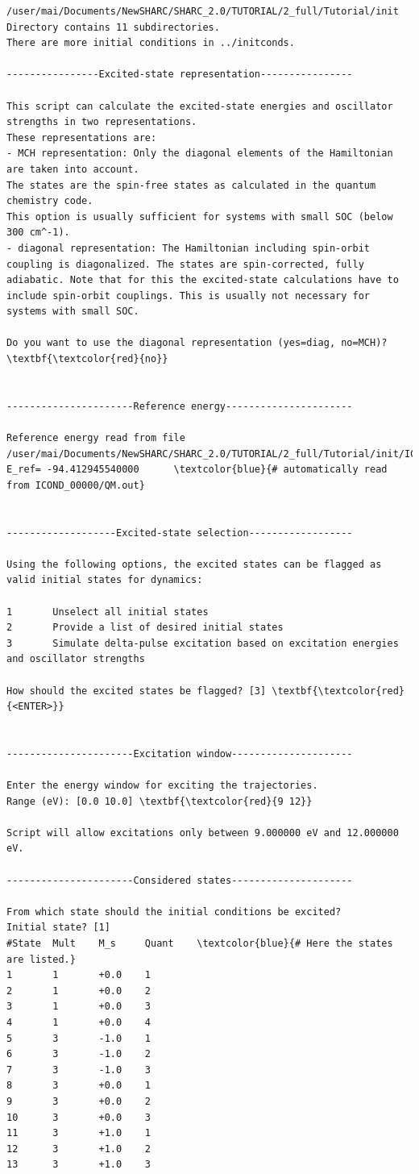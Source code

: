 \documentclass[a4paper,11pt,DIV=15,openany]{scrbook}
\begin{document}
\begin{oframed}
\begin{Verbatim}[commandchars=\\\{\}]
/user/mai/Documents/NewSHARC/SHARC_2.0/TUTORIAL/2_full/Tutorial/init
Directory contains 11 subdirectories.
There are more initial conditions in ../initconds.

----------------Excited-state representation----------------

This script can calculate the excited-state energies and oscillator strengths in two representations.
These representations are:
- MCH representation: Only the diagonal elements of the Hamiltonian are taken into account. 
The states are the spin-free states as calculated in the quantum chemistry code. 
This option is usually sufficient for systems with small SOC (below 300 cm^-1).
- diagonal representation: The Hamiltonian including spin-orbit coupling is diagonalized. The states are spin-corrected, fully adiabatic. Note that for this the excited-state calculations have to include spin-orbit couplings. This is usually not necessary for systems with small SOC.

Do you want to use the diagonal representation (yes=diag, no=MCH)? \textbf{\textcolor{red}{no}}


----------------------Reference energy----------------------

Reference energy read from file 
/user/mai/Documents/NewSHARC/SHARC_2.0/TUTORIAL/2_full/Tutorial/init/ICOND_00000/QM.out
E_ref= -94.412945540000      \textcolor{blue}{# automatically read from ICOND_00000/QM.out}


-------------------Excited-state selection------------------

Using the following options, the excited states can be flagged as valid initial states for dynamics:

1       Unselect all initial states
2       Provide a list of desired initial states
3       Simulate delta-pulse excitation based on excitation energies and oscillator strengths

How should the excited states be flagged? [3] \textbf{\textcolor{red}{<ENTER>}}


----------------------Excitation window---------------------

Enter the energy window for exciting the trajectories.
Range (eV): [0.0 10.0] \textbf{\textcolor{red}{9 12}}

Script will allow excitations only between 9.000000 eV and 12.000000 eV.

----------------------Considered states---------------------

From which state should the initial conditions be excited?
Initial state? [1] 
#State  Mult    M_s     Quant    \textcolor{blue}{# Here the states are listed.}
1       1       +0.0    1
2       1       +0.0    2
3       1       +0.0    3
4       1       +0.0    4
5       3       -1.0    1
6       3       -1.0    2
7       3       -1.0    3
8       3       +0.0    1
9       3       +0.0    2
10      3       +0.0    3
11      3       +1.0    1
12      3       +1.0    2
13      3       +1.0    3


\end{Verbatim}
\end{oframed}
\end{document}
